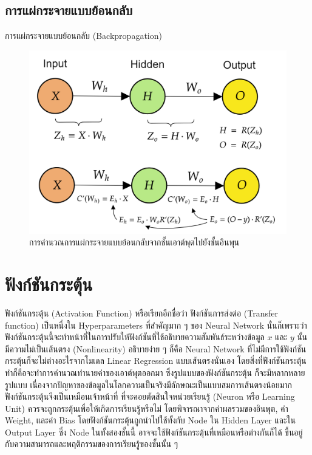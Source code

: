 \subsection{การแผ่กระจายแบบย้อนกลับ}
\label{ssec:backprop}

การแผ่กระจายแบบย้อนกลับ (Backpropagation)

\begin{figure}[H]
    \centering
    \includegraphics[width=0.8\linewidth]{fig/nn_backprop.png}
    \caption{การคำนวณการแผ่กระจายแบบย้อนกลับจากชั้นเอาต์พุตไปยังชั้นอินพุน}
    \label{fig:nn_bp}
\end{figure}

\section{ฟังก์ชันกระตุ้น}
\label{sec:act_func}

ฟังก์ชันกระตุ้น (Activation Function) หรือเรียกอีกชื่อว่า ฟังก์ชันการส่งต่อ (Transfer function) เป็นหนึ่งใน Hyperparameters 
ที่สำคัญมาก ๆ ของ Neural Network นั่นก็เพราะว่าฟังก์ชันกระตุ้นนี้จะทำหน้าที่ในการปรับให้ฟังก์ชันที่ใช้อธิบายความสัมพันธ์ระหว่างข้อมูล $x$ 
และ $y$ นั้นมีความไม่เป็นเส้นตรง (Nonlinearity) อธิบายง่าย ๆ ก็คือ Neural Network ที่ไม่มีการใช้ฟังก์ชันกระตุ้นก็จะไม่ต่างอะไรจากโมเดล
Linear Regression แบบเส้นตรงนั่นเอง โดยสิ่งที่ฟังก์ชันกระตุ้นทำก็คือจะทำการคำนวณทำนายค่าของเอาต์พุตออกมา ซึ่งรูปแบบของฟังก์ชันกระตุ้น%
ก็จะมีหลากหลายรูปแบบ เนื่องจากปัญหาของข้อมูลในโลกความเป็นจริงมีลักษณะเป็นแบบสมการเส้นตรงน้อยมาก ฟังก์ชันกระตุ้นจึงเป็นเหมือนเจ้าหน้าที่%
ที่จะคอยตัดสินใจหน่วยเรียนรู้ (Neuron หรือ Learning Unit) ควรจะถูกกระตุ้นเพื่อให้เกิดการเรียนรู้หรือไม่ โดยพิจารณาจากค่าผลรวมของอินพุต, 
ค่า Weight, และค่า Bias โดยฟังก์ชันกระตุ้นถูกนำไปใช้ทั้งกับ Node ใน Hidden Layer และใน Output Layer ซึ่ง Node ในทั้งสองชั้นนี้%
อาจจะใช้ฟังก์ชันกระตุ้นที่เหมือนหรือต่างกันก็ได้ ขึ้นอยู่กับความสามารถและพฤติกรรมของการเรียนรู้ของชั้นนั้น ๆ 

